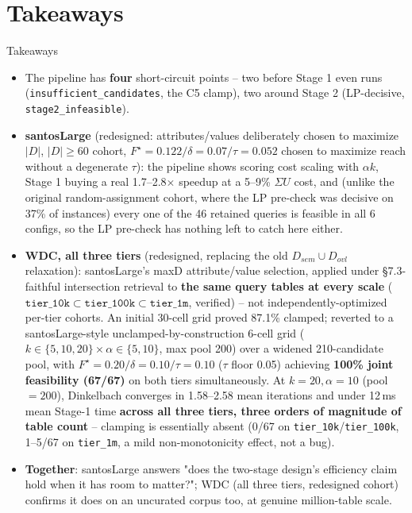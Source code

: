 \documentclass[aspectratio=169,10pt]{beamer}
\newcommand{\highlight}[1]{{\color{Cat1}\bfseries #1}}
\begin{document}
\section{Takeaways}
\begin{frame}{Takeaways}
\footnotesize
\begin{itemize}
  \item The pipeline has \textbf{four} short-circuit points -- two before Stage 1 even runs (\texttt{insufficient\_candidates}, the C5 clamp), two around Stage 2 (LP-decisive, \texttt{stage2\_infeasible}).
  \vspace{2pt}
  \item \textbf{santosLarge} (redesigned: attributes/values deliberately chosen to maximize $|D|$, $|D|\geq 60$ cohort, $F^\star{=}0.122/\delta{=}0.07/\tau{=}0.052$ chosen to maximize reach without a degenerate $\tau$): the pipeline shows scoring cost scaling with $\alpha k$, Stage 1 buying a real 1.7--2.8$\times$ speedup at a 5--9\% $\Sigma U$ cost, and (unlike the original random-assignment cohort, where the LP pre-check was decisive on 37\% of instances) every one of the 46 retained queries is feasible in all 6 configs, so the LP pre-check has nothing left to catch here either.
  \vspace{2pt}
  \item \textbf{WDC, all three tiers} (redesigned, replacing the old $D_{sem}\cup D_{ovl}$ relaxation): santosLarge's maxD attribute/value selection, applied under \S7.3-faithful intersection retrieval to \highlight{the same query tables at every scale} ($\texttt{tier\_10k}\subset\texttt{tier\_100k}\subset\texttt{tier\_1m}$, verified) -- not independently-optimized per-tier cohorts. An initial 30-cell grid proved 87.1\% clamped; reverted to a santosLarge-style unclamped-by-construction 6-cell grid ($k\in\{5,10,20\}\times\alpha\in\{5,10\}$, max pool 200) over a widened 210-candidate pool, with $F^\star{=}0.20/\delta{=}0.10/\tau{=}0.10$ ($\tau$ floor 0.05) achieving \highlight{100\% joint feasibility (67/67)} on both tiers simultaneously. At $k{=}20,\alpha{=}10$ (pool$=200$), Dinkelbach converges in 1.58--2.58 mean iterations and under 12\,ms mean Stage-1 time \highlight{across all three tiers, three orders of magnitude of table count} -- clamping is essentially absent (0/67 on \texttt{tier\_10k}/\texttt{tier\_100k}, 1--5/67 on \texttt{tier\_1m}, a mild non-monotonicity effect, not a bug).
  \vspace{2pt}
  \item \textbf{Together}: santosLarge answers "does the two-stage design's efficiency claim hold when it has room to matter?"; WDC (all three tiers, redesigned cohort) confirms it does on an uncurated corpus too, at genuine million-table scale.
\end{itemize}
\end{frame}
\end{document}
